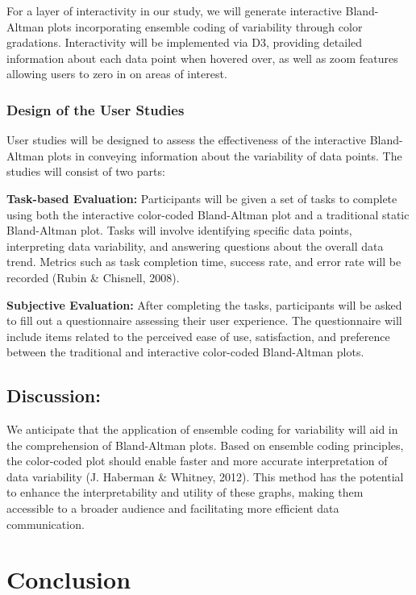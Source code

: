 \documentclass[print]{nuthesis}
\begin{document}
For a layer of interactivity in our study, we will generate interactive Bland-Altman plots incorporating ensemble coding of variability through color gradations.
Interactivity will be implemented via D3, providing detailed information about each data point when hovered over, as well as zoom features allowing users to zero in on areas of interest.

\hypertarget{design-of-the-user-studies}{%
\subsection{Design of the User Studies}\label{design-of-the-user-studies}}

User studies will be designed to assess the effectiveness of the interactive Bland-Altman plots in conveying information about the variability of data points.
The studies will consist of two parts:

\textbf{Task-based Evaluation:} Participants will be given a set of tasks to complete using both the interactive color-coded Bland-Altman plot and a traditional static Bland-Altman plot.
Tasks will involve identifying specific data points, interpreting data variability, and answering questions about the overall data trend.
Metrics such as task completion time, success rate, and error rate will be recorded (Rubin \& Chisnell, 2008).

\textbf{Subjective Evaluation:} After completing the tasks, participants will be asked to fill out a questionnaire assessing their user experience.
The questionnaire will include items related to the perceived ease of use, satisfaction, and preference between the traditional and interactive color-coded Bland-Altman plots.

\hypertarget{discussion-1}{%
\section{Discussion:}\label{discussion-1}}

We anticipate that the application of ensemble coding for variability will aid in the comprehension of Bland-Altman plots.
Based on ensemble coding principles, the color-coded plot should enable faster and more accurate interpretation of data variability (J. Haberman \& Whitney, 2012).
This method has the potential to enhance the interpretability and utility of these graphs, making them accessible to a broader audience and facilitating more efficient data communication.

\hypertarget{conclusion}{%
\chapter*{Conclusion}\label{conclusion}}
\end{document}
